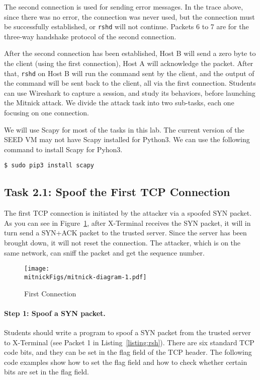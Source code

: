 The second connection is used for sending error messages. 
In the trace above, since there was no error, the connection was never used, 
but the connection must be successfully established, or \texttt{rshd} 
will not continue. Packets 6 to 7 are for the three-way handshake protocol
of the second connection. 


After the second connection has been established, 
Host B will send a zero byte to the client (using the first connection),
Host A will acknowledge the packet. After that, \texttt{rshd} on Host B
will run the command sent by the client, and the
output of the command will be sent back to the client, all via the 
first connection. 
Students can use Wireshark to capture a \rsh session, and study its
behaviors, before launching the Mitnick attack. 
We divide the attack task into two sub-tasks, each one focusing on one connection. 



We will use Scapy for most of the tasks in this lab.
The current version of the SEED VM may not have Scapy installed for Python3.
We can use the following command to install Scapy for Pyhon3.

\begin{lstlisting}
$ sudo pip3 install scapy
\end{lstlisting}



\subsection{Task 2.1: Spoof the First TCP Connection}
\label{sec:first-conn}

The first TCP connection is initiated by the attacker via a spoofed SYN packet. As you can see
in Figure~\ref{fig:first-conn}, after X-Terminal receives the SYN packet, it will in turn send
a SYN+ACK packet to the trusted server. Since the server has been brought down, it will not
reset the connection. The attacker, which is on the same network, can sniff the packet and get
the sequence number.

\begin{figure}[htb]
\centering
\texttt{[image: \\mitnickFigs/mitnick-diagram-1.pdf]}
\caption{First Connection}
\label{fig:first-conn}
\end{figure}


\paragraph{Step 1: Spoof a SYN packet.}
Students should write a program to spoof a SYN packet 
from the trusted server to X-Terminal (see Packet 1 in Listing~\ref{listing:rsh}). 
There are six standard 
TCP code bits, and they can be set in the flag field of the TCP header. 
The following code examples show how to set the flag field
and how to check whether certain bits are set in
the flag field. 

